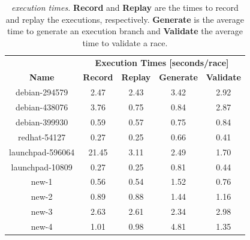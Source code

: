 \begin{table}[t]
\centering
\begin{tabular}{c|cccc}
  & 
  \multicolumn{4}{|c}{\bf Execution Times [seconds/race]} \\
  {\bf Name} & {\bf Record} & {\bf Replay} & {\bf Generate} & {\bf Validate} \\
\hline
debian-294579    &  2.47  &  2.43  &  3.42  &  2.92  \\
debian-438076    &  3.76  &  0.75  &  0.84  &  2.87  \\
debian-399930    &  0.59  &  0.57  &  0.75  &  0.84  \\
redhat-54127     &  0.27  &  0.25  &  0.66  &  0.41  \\
launchpad-596064 &  21.45 &  3.11  &  2.49  &  1.70  \\
launchpad-10809  &  0.27  &  0.25  &  0.81  &  0.44  \\
new-1            &  0.56  &  0.54  &  1.52  &  0.76  \\
new-2            &  0.89  &  0.88  &  1.44  &  1.16  \\
new-3            &  2.63  &  2.61  &  2.34  &  2.98  \\
new-4            &  1.01  &  0.98  &  4.81  &  1.35  \\
\end{tabular}
\caption{{\em \racepro execution times.}  {\bf Record} and {\bf Replay} are the
times to record and replay the executions, respectively. {\bf Generate} is the
average time to generate an execution branch and {\bf Validate} the average time
to validate a race.} \label{racepro:tab:bug-execution-times}
\end{table}

